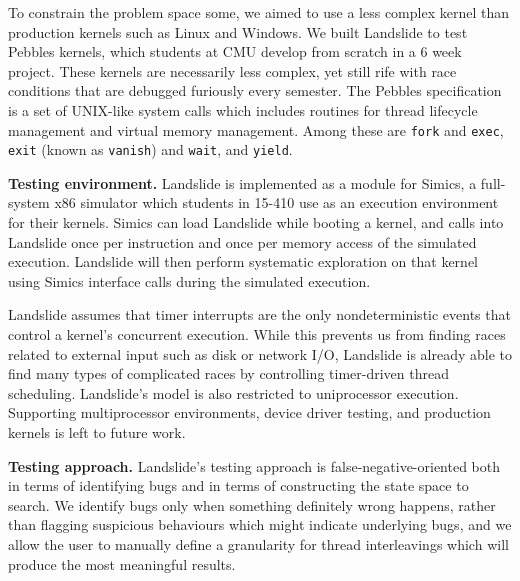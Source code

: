 \documentclass{llncs}
\begin{document}

To constrain the problem space some, we aimed to use a less complex kernel than production kernels such as Linux and Windows. We built Landslide to test Pebbles kernels, which students at CMU develop from scratch in a 6 week project. These kernels are necessarily less complex, yet still rife with race conditions that are debugged furiously every semester.
The Pebbles specification \cite{kspec} is a set of UNIX-like system calls which includes routines for thread lifecycle management and virtual memory management. Among these are \texttt{fork} and \texttt{exec}, \texttt{exit} (known as \texttt{vanish}) and \texttt{wait}, and \texttt{yield}.

{\bf Testing environment.} Landslide is implemented as a module for Simics, a full-system x86 simulator which students in 15-410 use as an execution environment for their kernels. Simics can load Landslide while booting a kernel, and calls into Landslide once per instruction and once per memory access of the simulated execution. Landslide will then perform systematic exploration on that kernel using Simics interface calls during the simulated execution.

Landslide assumes that timer interrupts are the only nondeterministic events that control a kernel's concurrent execution. While this prevents us from finding races related to external input such as disk or network I/O, Landslide is already able to find many types of complicated races by controlling timer-driven thread scheduling.
Landslide's model is also restricted to uniprocessor execution. Supporting multiprocessor environments, device driver testing, and production kernels is left to future work.


{\bf Testing approach.} Landslide's testing approach is false-negative-oriented both in terms of identifying bugs and in terms of constructing the state space to search. 
We identify bugs only when something definitely wrong happens, rather than flagging suspicious behaviours which might indicate underlying bugs, and we allow the user to manually define a granularity for thread interleavings which will produce the most meaningful results.
\end{document}
